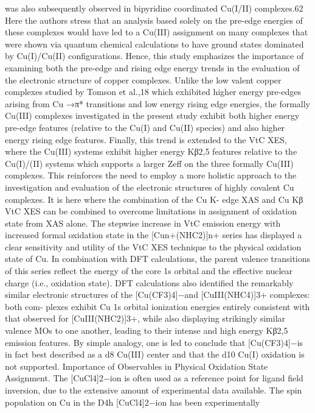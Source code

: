 \documentclass{article}
\begin{document}
was also subsequently observed in bipyridine coordinated
Cu(I/II) complexes.62 Here the authors stress that an analysis
based solely on the pre-edge energies of these complexes
would have led to a Cu(III) assignment on many complexes
that were shown via quantum chemical calculations to have
ground states dominated by Cu(I)/Cu(II) conﬁgurations.
Hence, this study emphasizes the importance of examining
both the pre-edge and rising edge energy trends in the
evaluation of the electronic structure of copper complexes.
Unlike the low valent copper complexes studied by Tomson et
al.,18 which exhibited higher energy pre-edges arising from Cu
→π* transitions and low energy rising edge energies, the
formally Cu(III) complexes investigated in the present study
exhibit both higher energy pre-edge features (relative to the
Cu(I) and Cu(II) species) and also higher energy rising edge
features. Finally, this trend is extended to the VtC XES, where
the Cu(III) systems exhibit higher energy Kβ2,5 features
relative to the Cu(I)/(II) systems which supports a larger Zeff
on the three formally Cu(III) complexes. This reinforces the
need to employ a more holistic approach to the investigation
and evaluation of the electronic structures of highly covalent
Cu complexes. It is here where the combination of the Cu K-
edge XAS and Cu Kβ VtC XES can be combined to overcome
limitations in assignment of oxidation state from XAS alone.
The stepwise increase in VtC emission energy with increased
formal oxidation state in the [Cun+(NHC2)]n+ series has
displayed a clear sensitivity and utility of the VtC XES
technique to the physical oxidation state of Cu. In combination
with DFT calculations, the parent valence transitions of this
series reﬂect the energy of the core 1s orbital and the eﬀective
nuclear charge (i.e., oxidation state). DFT calculations also
identiﬁed the remarkably similar electronic structures of the
[Cu(CF3)4]−and [CuIII(NHC4)]3+ complexes: both com-
plexes exhibit Cu 1s orbital ionization energies entirely
consistent with that observed for [CuIII(NHC2)]3+, while
also displaying strikingly similar valence MOs to one another,
leading to their intense and high energy Kβ2,5 emission
features. By simple analogy, one is led to conclude that
[Cu(CF3)4]−is in fact best described as a d8 Cu(III) center
and that the d10 Cu(I) oxidation is not supported.
Importance of Observables in Physical Oxidation
State Assignment. The [CuCl4]2−ion is often used as a
reference point for ligand ﬁeld inversion, due to the extensive
amount of experimental data available. The spin population on
Cu in the D4h [CuCl4]2−ion has been experimentally
\end{document}
